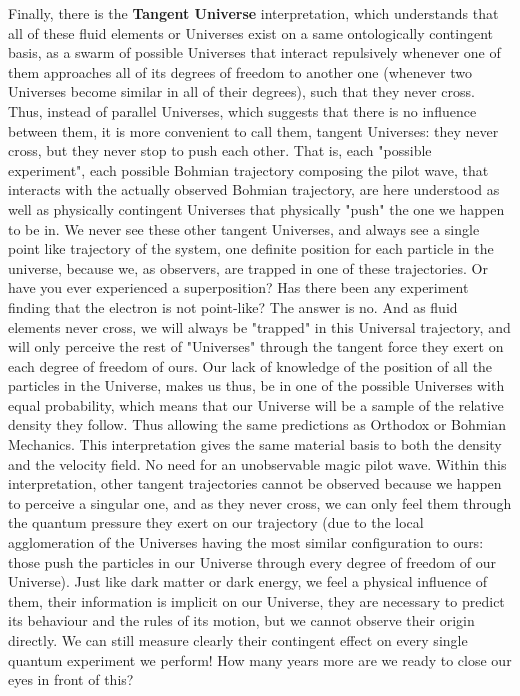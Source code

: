 \documentclass[11pt, a4paper]{article} %
\begin{document}
Finally, there is the {\bf Tangent Universe} interpretation, which understands that all of these fluid elements or Universes exist on a same ontologically contingent basis, as a swarm of possible Universes that interact repulsively whenever one of them approaches all of its degrees of freedom to another one (whenever two Universes become similar in all of their degrees), such that they never cross. Thus, instead of parallel Universes, which suggests that there is no influence between them, it is more convenient to call them, tangent Universes: they never cross, but they never stop to push each other. That is, each "possible experiment", each possible Bohmian trajectory composing the pilot wave, that interacts with the actually observed Bohmian trajectory, are here understood as well as physically contingent Universes that physically "push" the one we happen to be in. We never see these other tangent Universes, and always see a single point like trajectory of the system, one definite position for each particle in the universe, because we, as observers, are trapped in one of these trajectories. Or have you ever experienced a superposition? Has there been any experiment finding that the electron is not point-like? The answer is no. And as fluid elements never cross, we will always be "trapped" in this Universal trajectory, and will only perceive the rest of "Universes" through the tangent force they exert on each degree of freedom of ours. Our lack of knowledge of the position of all the particles in the Universe, makes us thus, be in one of the possible Universes with equal probability, which means that our Universe will be a sample of the relative density they follow. Thus allowing the same predictions as Orthodox or Bohmian Mechanics. This interpretation gives the same material basis to both the density and the velocity field. No need for an unobservable magic pilot wave. Within this interpretation, other tangent trajectories cannot be observed because we happen to perceive a singular one, and as they never cross, we can only feel them through the quantum pressure they exert on our trajectory (due to the local agglomeration of the Universes having the most similar configuration to ours: those push the particles in our Universe through every degree of freedom of our Universe). Just like dark matter or dark energy, we feel a physical influence of them, their information is implicit on our Universe, they are necessary to predict its behaviour and the rules of its motion, but we cannot observe their origin directly. We can still measure clearly their contingent effect on every single quantum experiment we perform! How many years more are we ready to close our eyes in front of this?
\end{document}
